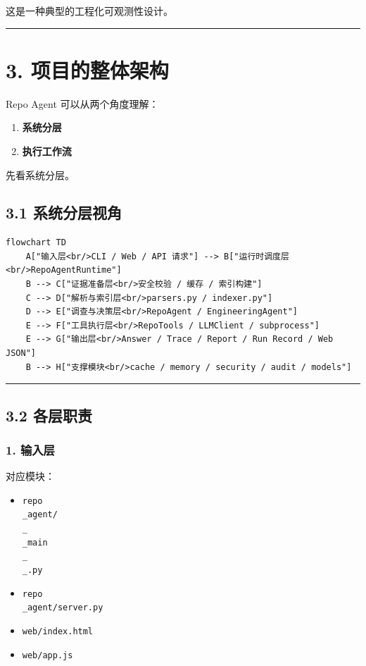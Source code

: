 \documentclass[UTF8,12pt,openany]{ctexbook}
\begin{document}
这是一种典型的工程化可观测性设计。\par

\hrule

\section{3. 项目的整体架构}

Repo Agent 可以从两个角度理解：\par

\begin{enumerate}
\item \textbf{系统分层}
\item \textbf{执行工作流}
\end{enumerate}

先看系统分层。\par

\subsection{3.1 系统分层视角}

\begin{lstlisting}
flowchart TD
    A["输入层<br/>CLI / Web / API 请求"] --> B["运行时调度层<br/>RepoAgentRuntime"]
    B --> C["证据准备层<br/>安全校验 / 缓存 / 索引构建"]
    C --> D["解析与索引层<br/>parsers.py / indexer.py"]
    D --> E["调查与决策层<br/>RepoAgent / EngineeringAgent"]
    E --> F["工具执行层<br/>RepoTools / LLMClient / subprocess"]
    E --> G["输出层<br/>Answer / Trace / Report / Run Record / Web JSON"]
    B --> H["支撑模块<br/>cache / memory / security / audit / models"]
\end{lstlisting}

\hrule

\subsection{3.2 各层职责}

\subsubsection{1. 输入层}

对应模块：\par

\begin{itemize}
\item \texttt{repo\\_agent/\\_\\_main\\_\\_.py}
\item \texttt{repo\\_agent/server.py}
\item \texttt{web/index.html}
\item \texttt{web/app.js}
\end{itemize}
\end{document}
